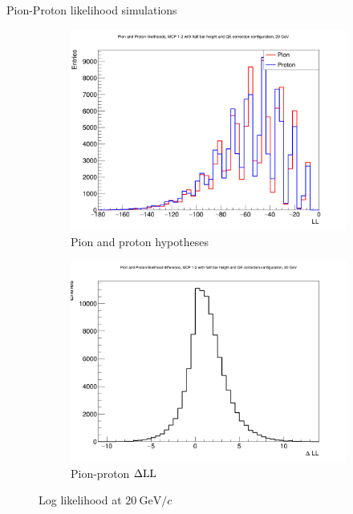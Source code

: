 \documentclass{beamer}
\begin{document}
\begin{frame}{Pion-Proton likelihood simulations}
  \begin{figure}
    \centering
    \vspace{-0.2cm}
    \begin{subfigure}{0.5\textwidth}
      \includegraphics[width = 1.0\textwidth]{Plots/ProtonPionLL20GeVStandardMCPAB.png}
      \caption{Pion and proton hypotheses}
    \end{subfigure}%
    \begin{subfigure}{0.5\textwidth}
      \includegraphics[width = 1.0\textwidth]{Plots/ProtonPionDLL20GeVStandardMCPAB.png}
      \caption{Pion-proton $\Delta{\rm LL}$}
    \end{subfigure}
    \caption{Log likelihood at $\SI{20}{\giga\eV/c}$}
  \end{figure}
\end{frame}
\end{document}
